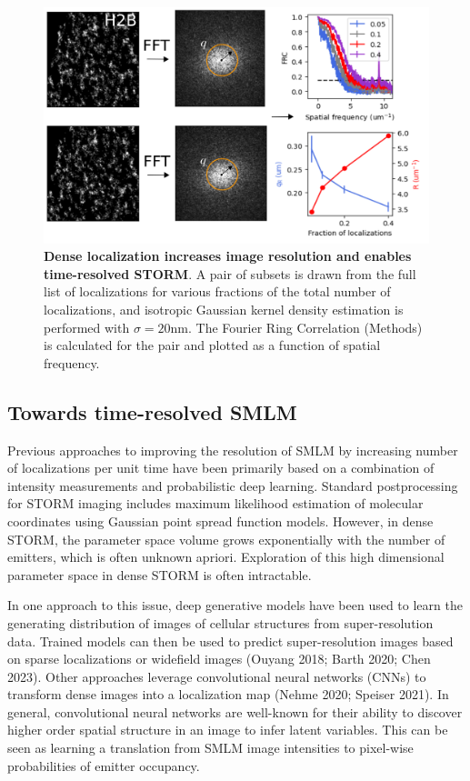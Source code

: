 \documentclass{ucetd}
\begin{document}
\begin{figure}
\begin{center}
\includegraphics[width=13cm]{FRC.png}
\end{center}
\caption{\textbf{Dense localization increases image resolution and enables time-resolved STORM}. A pair of subsets is drawn from the full list of localizations for various fractions of the total number of localizations, and isotropic Gaussian kernel density estimation is performed with $\sigma=20\mathrm{nm}$. The Fourier Ring Correlation (Methods) is calculated for the pair and plotted as a function of spatial frequency.}
\end{figure}


\subsection{Towards time-resolved SMLM}

Previous approaches to improving the resolution of SMLM by increasing number of localizations per unit time have been primarily based on a combination of intensity measurements and probabilistic deep learning. Standard postprocessing for STORM imaging includes maximum likelihood estimation of molecular coordinates using Gaussian point spread function models. However, in dense STORM, the parameter space volume grows exponentially with the number of emitters, which is often unknown apriori. Exploration of this high dimensional parameter space in dense STORM is often intractable. 

In one approach to this issue, deep generative models have been used to learn the generating distribution of images of cellular structures from super-resolution data. Trained models can then be used to predict super-resolution images based on sparse localizations or widefield images (Ouyang 2018; Barth 2020; Chen 2023). Other approaches leverage convolutional neural networks (CNNs) to transform dense images into a localization map (Nehme 2020; Speiser 2021). In general, convolutional neural networks are well-known for their ability to discover higher order spatial structure in an image to infer latent variables. This can be seen as learning a translation from SMLM image intensities to pixel-wise probabilities of emitter occupancy. 
\end{document}

